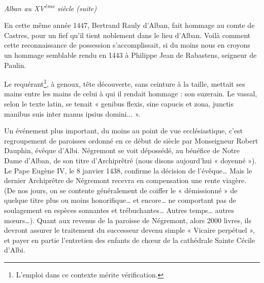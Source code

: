 
\begin{center}
    {\Large\itshape Alban au XV\textsuperscript{ème} siècle (suite)}
\end{center}

\vspace{1.5em}

En cette même année 1447, Bertrand Rauly d'Alban, fait hommage au comte
de Castres, pour un fief qu'il tient noblement dans le lieu d'Alban. Voilà
comment cette reconnaissance de possession s'accomplissait, si du moins
nous en croyons un hommage semblable rendu en 1443 à Philippe Jean de
Rabastens, seigneur de Paulin.

\medskip

Le requérant\footnote{L'emploi dans ce contexte mérite vérification.}, à genoux, tête découverte, sans ceinture à la taille,
mettait ses mains entre les mains de celui à qui il rendait hommage :
son suzerain. Le vassal, selon le texte latin, se tenait « genibus flexis,
sine capucis et zona, junctis manibus suis inter manus ipsius domini... ».

\medskip

Un événement plus important, du moins au point de vue ecclésiastique,
c'est regroupement de paroisses ordonné en ce début de siècle par
Monseigneur Robert Dauphin, évêque d'Albi. Négremont se voit dépossédé,
au bénéfice de Notre Dame d'Alban, de son titre d'Archiprêtré (nous
disons aujourd'hui « doyenné »). Le Pape Eugène IV, le 8 janvier 1438,
confirme la décision de l'évêque… Mais le dernier Archiprêtre de
Négremont recevra en compensation une rente viagère. (De nos jours, on
se contente généralement de coiffer le « démissionné » de quelque titre
plus ou moins honorifique… et encore… ne comportant pas de soulagement
en espèces sonnantes et trébuchantes… Autres temps… autres mœurs…).
Quant aux revenus de la paroisse de Négremont, alors 2000 livres, ils
devront assurer le traitement du successeur devenu simple « Vicaire
perpétuel », et payer en partie l'entretien des enfants de chœur de la
cathédrale Sainte Cécile d'Albi.
